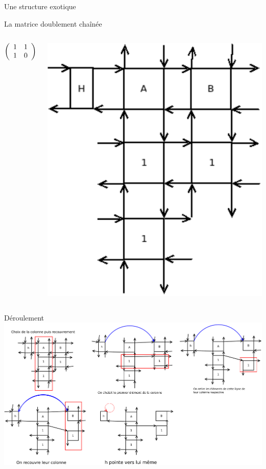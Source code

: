 \documentclass{beamer}
\begin{document}
\begin{frame}{Une structure exotique}

La matrice doublement chaînée

 \begin{columns}
\begin{center}$
\left(\begin{array}{ c c c c c }
   1 & 1 \\
   1 & 0 
  \end{array}\right)$
\end{center}

\includegraphics[scale=0.4]{../imports/dlx_matrice.pdf}
 \end{columns}

\end{frame}

\begin{frame}{Déroulement}
\includegraphics[scale=0.18]{../imports/first_iter.pdf}
\end{frame}
\end{document}
